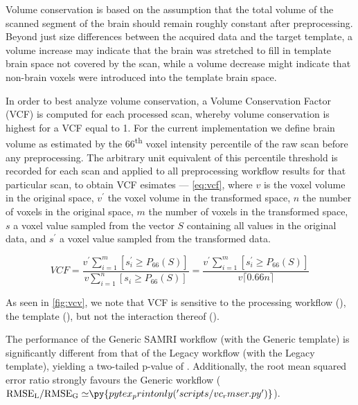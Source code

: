 Volume conservation is based on the assumption that the total volume of the scanned segment of the brain should remain roughly constant after preprocessing.
Beyond just size differences between the acquired data and the target template, a volume increase may indicate that the brain was stretched to fill in template brain space not covered by the scan, while a volume decrease might indicate that non-brain voxels were introduced into the template brain space.

In order to best analyze volume conservation, a Volume Conservation Factor (VCF) is computed for each processed scan, whereby volume conservation is highest for a VCF equal to 1.
For the current implementation we define brain volume as estimated by the 66\textsuperscript{th} voxel intensity percentile of the raw scan before any preprocessing.
The arbitrary unit equivalent of this percentile threshold is recorded for each scan and applied to all preprocessing workflow results for that particular scan, to obtain VCF esimates
 --- \cref{eq:vcf}, where $v$ is the voxel volume in the original space, $v^\prime$ the voxel volume in the transformed space, $n$ the number of voxels in the original space, $m$ the number of voxels in the transformed space, $s$ a voxel value sampled from the vector $S$ containing all values in the original data, and $s^\prime$ a voxel value sampled from the transformed data.

\begin{equation} \label{eq:vcf}
        V\!C\!F
        = \frac{v^\prime\sum_{i=1}^m [s^\prime_i \geq P_{66}(S)]}{v\sum_{i=1}^n [s_i \geq P_{66}(S)]}
        = \frac{v^\prime\sum_{i=1}^m [s^\prime_i \geq P_{66}(S)]}{v \lceil0.66n\rceil}
\end{equation}

As seen in \cref{fig:vcv}, we note that VCF is sensitive to
the processing workflow (),
the template (),
but not the interaction thereof ().

The performance of the Generic SAMRI workflow (with the Generic template) is significantly different from that of the Legacy workflow (with the Legacy template), yielding a two-tailed p-value of .
Additionally, the root mean squared error ratio strongly favours the Generic workflow
($\mathrm{RMSE_{L}/RMSE_{G}\simeq} \py{pytex_printonly('scripts/vc_rmser.py')}$).

